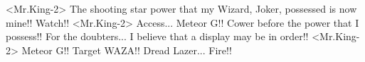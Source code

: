 <Mr.King-2> The shooting star power that my Wizard, Joker, possessed is now mine!! 
Watch!! 
<Mr.King-2> Access... Meteor G!! 
Cower before the power that I possess!! 
For the doubters... I believe that a display may be in order!! 
<Mr.King-2> Meteor G!! Target WAZA!! 
Dread Lazer... Fire!! 
